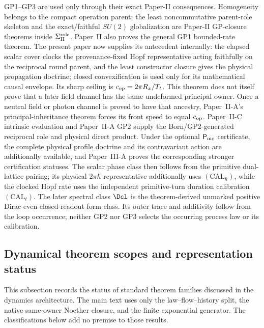 \documentclass[11pt,a4paper]{article}
\begin{document}
\begin{remark}
\label{p3:rem:gp-use}
GP1--GP3 are used only through their exact Paper-II consequences.  Homogeneity
belongs to the compact operation parent; the least noncommutative parent-role skeleton and the exact/faithful $SU(2)$ globalization are
Paper-II GP-closure theorems inside
\(\Sigma_{\rm II}^{\rm role}\).  Paper~II also proves the general GP1
bounded-rate theorem.  The present paper now supplies its antecedent
internally: the elapsed scalar cover clocks the provenance-fixed Hopf representative acting
faithfully on the reciprocal round parent, and the least constructor closure
gives the physical propagation doctrine; closed convexification is used only
for its mathematical causal envelope.  Its sharp ceiling is
\(c_{\rm op}=2\pi R_x/T_t\).  This theorem does not itself prove that a later
field channel has the same undeformed principal owner.  Once a neutral field
or photon channel is proved to have that ancestry, Paper~II-A's
principal-inheritance theorem forces its front speed to equal
\(c_{\rm op}\).  Paper~II-C intrinsic evaluation and Paper~II-A GP2
supply the Born/GP2-generated reciprocal role and physical direct product.  Under the
optional \(\mathsf P_{\rm mc}\) certificate, the complete physical profile
doctrine and its contravariant action are additionally available, and
Paper~III-A proves the corresponding stronger certification statuses.  The
scalar phase class then follows from the primitive dual-lattice pairing;
its physical $2\pi\hbar$ representative additionally uses
$(\mathrm{CAL}_{\hbar})$, while the clocked Hopf rate uses the independent
primitive-turn duration calibration $(\mathrm{CAL}_{t})$.  The later spectral class \(\Dcl\) is the
theorem-derived unmarked positive Dirac-even closed-readout form class.  Its
outer trace and additivity follow from the loop occurrence; neither GP2 nor
GP3 selects the occurring process law or its calibration.
\end{remark}








\subsection{Dynamical theorem scopes and representation status}
\label{p3a:app:v149-theorem-status-taxonomy}
This subsection records the status of standard theorem families discussed in the
dynamics architecture.  The main text uses only the law--flow--history split,
the native same-owner Noether closure, and the finite exponential generator.
The classifications below add no premise to those results.
\end{document}
